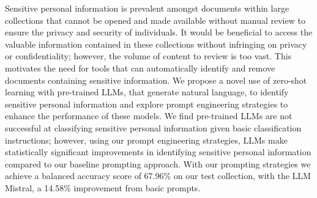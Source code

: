 Sensitive personal information is prevalent amongst documents within large collections that cannot be opened and made available without manual review to ensure the privacy and security of individuals. It would be beneficial to access the valuable information contained in these collections without infringing on privacy or confidentiality; however, the volume of content to review is too vast. This motivates the need for tools that can automatically identify and remove documents containing sensitive information. We propose a novel use of zero-shot learning with pre-trained LLMs, that generate natural language, to identify sensitive personal information and explore prompt engineering strategies to enhance the performance of these models. We find pre-trained LLMs are not successful at classifying sensitive personal information given basic classification instructions; however, using our prompt engineering strategies, LLMs make statistically significant improvements in identifying sensitive personal information compared to our baseline prompting approach. With our prompting strategies we achieve a balanced accuracy score of 67.96\% on our test collection, with the LLM Mistral, a 14.58\% improvement from basic prompts.
